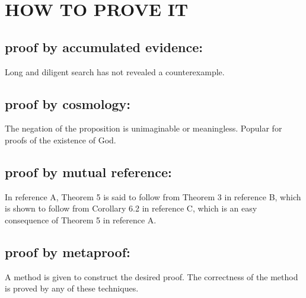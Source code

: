 \chapter{\texorpdfstring{HOW TO PROVE IT}{}} %
\setcounter{equation}{0} 

\section{proof by accumulated evidence:}

	Long and diligent search has not revealed a counterexample.

\section{proof by cosmology:}

	The negation of the proposition is unimaginable or
	meaningless. Popular for proofs of the existence of God.

\section{proof by mutual reference:}

	In reference A, Theorem 5 is said to follow from Theorem 3 in
	reference B, which is shown to follow from Corollary 6.2 in
	reference C, which is an easy consequence of Theorem 5 in
	reference A.

\section{proof by metaproof:}

	A method is given to construct the desired proof. The
	correctness of the method is proved by any of these
	techniques.
